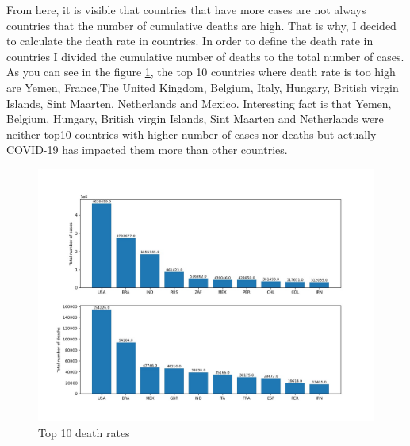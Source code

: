 \documentclass[12pt, letterpaper]{article}
\begin{document}
From here, it is visible that countries that have more cases are not always countries that the number of cumulative deaths are high. That is why, I decided to calculate the death rate in countries. In order to define the death rate in countries I divided the cumulative number of deaths to the total number of cases. As you can see in the figure \ref{fig:plot2}, the top 10 countries where death rate is too high are Yemen, France,The United Kingdom, Belgium, Italy, Hungary, British virgin Islands, Sint Maarten, Netherlands and Mexico. Interesting fact is that Yemen, Belgium, Hungary, British virgin Islands, Sint Maarten and Netherlands were neither top10 countries with higher number of cases nor deaths but actually COVID-19 has impacted them more than other countries.  
\begin{figure}[h]
    \centering
    \includegraphics[width=1\textwidth]{plot2}
    \caption{Top 10 death rates}
    \label{fig:plot2}
\end{figure}
\end{document}
